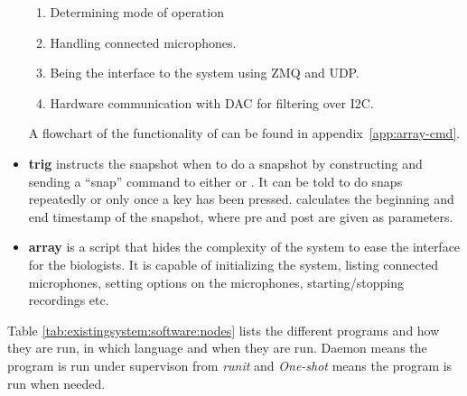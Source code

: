 \begin{itemize}
\begin{enumerate}
		\item Determining mode of operation
		\item Handling connected microphones.
		\item Being the interface to the system using ZMQ and UDP.
		\item Hardware communication with DAC for filtering over I2C.
	\end{enumerate} 
	
	A flowchart of the functionality of  can be found in appendix~\ref{app:array-cmd}. 
	
	\item \textbf{trig} instructs the snapshot when to do a snapshot by constructing and sending a “snap” command to either  or . It can be told to do snaps repeatedly or only once a key has been pressed.  calculates the beginning and end timestamp of the snapshot, where pre and post are given as parameters.
	
	\item \textbf{array} is a script that hides the complexity of the system to ease the interface for the biologists. It is capable of initializing the system, listing connected microphones, setting options on the microphones, starting/stopping recordings etc.

\end{itemize}


Table \ref{tab:existingsystem:software:nodes} lists the different programs and how they are run, in which language and when they are run. Daemon means the program is run under supervison from \textit{runit} and \textit{One-shot} means the program is run when needed.

\begin{table}[h!]
\centering
{}
\caption{My caption}
\label{my-label}
\end{table}


